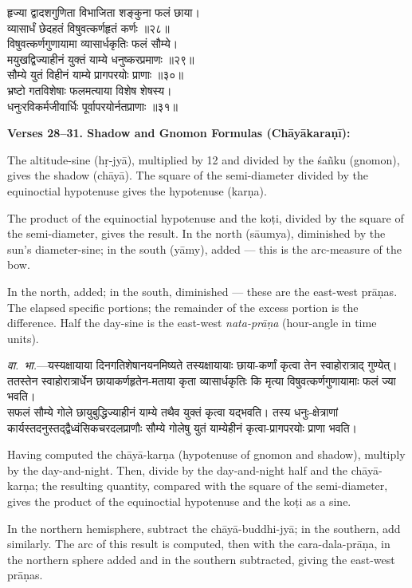 \documentclass[11pt,a4paper]{article}
\begin{document}
\begin{minipage}[t]{0.48\textwidth}
\small\devanagarifont
हृज्या द्वादशगुणिता विभाजिता शङ्कुना फलं छाया।\\
व्यासार्धं छेदहतं विषुवत्कर्णहृतं कर्णः ॥२८॥\\[0.5em]
विषुवत्कर्णगुणायामा व्यासार्धकृतिः फलं सौम्ये।\\
मयुखद्विज्याहीनं युक्तं याम्ये धनुष्करप्रमाणः ॥२९॥\\[0.5em]
सौम्ये युतं विहीनं याम्ये प्रागपरयोः प्राणाः ॥३०॥\\[0.5em]
भ्रष्टो गतविशेषाः फलमत्याया विशेष शेषस्य।\\
धनुःरविकर्मजीवार्धिः पूर्वापरयोर्नतप्राणाः ॥३१॥
\end{minipage}%
\hfill
\begin{minipage}[t]{0.48\textwidth}
\small
\textbf{Verses 28--31. Shadow and Gnomon Formulas (Ch\=ay\=akara\d{n}\=i):}

The altitude-sine (h\d{r}-jy\=a), multiplied by 12 and divided by the \'sa\~nku (gnomon), gives the shadow (ch\=ay\=a). The square of the semi-diameter divided by the equinoctial hypotenuse gives the hypotenuse (kar\d{n}a).

The product of the equinoctial hypotenuse and the ko\d{t}i, divided by the square of the semi-diameter, gives the result. In the north (s\=aumya), diminished by the sun's diameter-sine; in the south (y\=amy), added --- this is the arc-measure of the bow.

In the north, added; in the south, diminished --- these are the east-west pr\=a\d{n}as. The elapsed specific portions; the remainder of the excess portion is the difference. Half the day-sine is the east-west \textit{nata-pr\=a\d{n}a} (hour-angle in time units).
\end{minipage}

\vspace{0.5em}
\begin{minipage}[t]{0.48\textwidth}
\small\devanagarifont
\textit{वा.~भा.}---यस्यक्षायाया दिनगतिशेषानयनमिष्यते तस्यक्षायायाः छाया-कर्णां कृत्वा तेन स्वाहोरात्राद्‌ गुण्येत्। ततस्तेन स्वाहोरात्रार्धेन छायाकर्णहृतेन-मताया कृता व्यासार्धकृतिः कि मृत्या विषुवत्कर्णगुणायामाः फलं ज्या भवति।\\
सफलं सौम्ये गोले छायुबुद्धिज्याहीनं याम्ये तथैव युक्तं कृत्वा यद्‌भवति। तस्य धनुः-क्षेत्राणां कार्यस्तदनुस्तद्द्वैध्वंसिकचरदलप्राणौः सौम्ये गोलेषु युतं याम्येहीनं कृत्वा-प्रागपरयोः प्राणा भवति।
\end{minipage}%
\hfill
\begin{minipage}[t]{0.48\textwidth}
\small
Having computed the ch\=ay\=a-kar\d{n}a (hypotenuse of gnomon and shadow), multiply by the day-and-night. Then, divide by the day-and-night half and the ch\=ay\=a-kar\d{n}a; the resulting quantity, compared with the square of the semi-diameter, gives the product of the equinoctial hypotenuse and the ko\d{t}i as a sine.

In the northern hemisphere, subtract the ch\=ay\=a-buddhi-jy\=a; in the southern, add similarly. The arc of this result is computed, then with the cara-dala-pr\=a\d{n}a, in the northern sphere added and in the southern subtracted, giving the east-west pr\=a\d{n}as.
\end{minipage}
\end{document}
